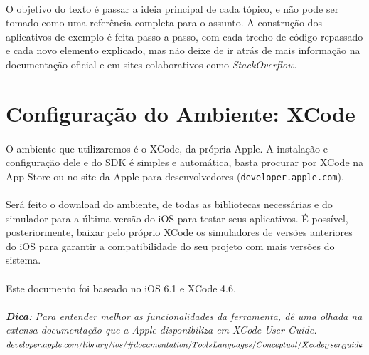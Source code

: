 \documentclass[a4paper,12pt,brazil,doubleside]{book}
\begin{document}
\paragraph{}O objetivo do texto é passar a ideia principal de cada tópico, e não pode ser tomado como uma referência completa para o assunto. A construção dos aplicativos de exemplo é feita passo a passo, com cada trecho de código repassado e cada novo elemento explicado, mas não deixe de ir atrás de mais informação na documentação oficial e em sites colaborativos como \emph{StackOverflow}.

\bigskip
\bigskip

\section{Configuração do Ambiente: XCode}

\paragraph{}O ambiente que utilizaremos é o XCode, da própria Apple. A instalação e configuração dele e do SDK é simples e automática, basta procurar por XCode na App Store ou no site da Apple para desenvolvedores (\texttt{developer.apple.com}).
\paragraph{}Será feito o download do ambiente, de todas as bibliotecas necessárias e do simulador para a última versão do iOS para testar seus aplicativos. É possível, posteriormente, baixar pelo próprio XCode os simuladores de versões anteriores do iOS para garantir a compatibilidade do seu projeto com mais versões do sistema.\\
\paragraph{}Este documento foi baseado no iOS 6.1 e XCode 4.6.\\

\paragraph{}\textit{\textbf{\underline{Dica}}: Para entender melhor as funcionalidades da ferramenta, dê uma olhada na extensa documentação que a Apple disponibiliza em 
XCode User Guide.\\
\(developer.apple.com/library/ios/\#documentation/ToolsLanguages/Conceptual/\\Xcode_User_Guide\)}
\end{document}
